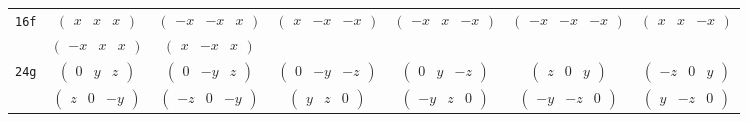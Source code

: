 \documentclass[fleqn,9pt,landscape]{jsarticle}
\begin{document}
\begin{center}
\begin{longtable}{ccccccc}
{\tt 16f} & $ \begin{pmatrix} x & x & x \end{pmatrix} $ & $ \begin{pmatrix} - x & - x & x \end{pmatrix} $ & $ \begin{pmatrix} x & - x & - x \end{pmatrix} $ & $ \begin{pmatrix} - x & x & - x \end{pmatrix} $ & $ \begin{pmatrix} - x & - x & - x \end{pmatrix} $ & $ \begin{pmatrix} x & x & - x \end{pmatrix} $ \\
& $ \begin{pmatrix} - x & x & x \end{pmatrix} $ & $ \begin{pmatrix} x & - x & x \end{pmatrix} $ & $  $ & $  $ & $  $ & $  $ \\ \hline
{\tt 24g} & $ \begin{pmatrix} 0 & y & z \end{pmatrix} $ & $ \begin{pmatrix} 0 & - y & z \end{pmatrix} $ & $ \begin{pmatrix} 0 & - y & - z \end{pmatrix} $ & $ \begin{pmatrix} 0 & y & - z \end{pmatrix} $ & $ \begin{pmatrix} z & 0 & y \end{pmatrix} $ & $ \begin{pmatrix} - z & 0 & y \end{pmatrix} $ \\
& $ \begin{pmatrix} z & 0 & - y \end{pmatrix} $ & $ \begin{pmatrix} - z & 0 & - y \end{pmatrix} $ & $ \begin{pmatrix} y & z & 0 \end{pmatrix} $ & $ \begin{pmatrix} - y & z & 0 \end{pmatrix} $ & $ \begin{pmatrix} - y & - z & 0 \end{pmatrix} $ & $ \begin{pmatrix} y & - z & 0 \end{pmatrix} $ \\ \hline

\end{longtable}
\end{center}
\end{document}
